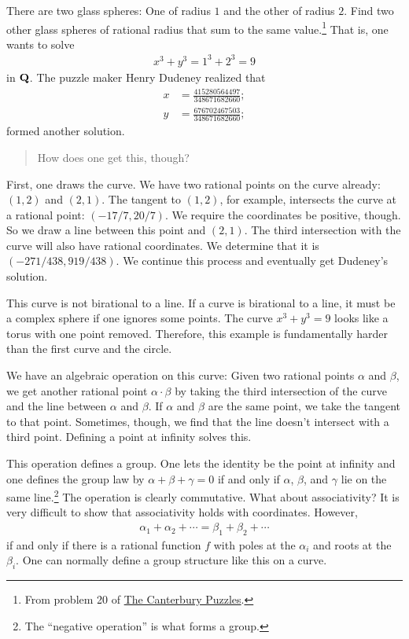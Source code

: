 \documentclass [11 pt, oneside] {article}
\begin{document}
\begin{example}[ ]\label{}\text{}
There are two glass spheres: One of radius $1$ and the other of radius $2$. Find two other glass spheres of rational radius that sum to the same value.\footnote{From problem 20 of \ul{The Canterbury Puzzles}.} That is, one wants to solve
\begin{align*}
	x^3 + y^3 = 1^3 + 2^3 = 9
\end{align*}
in $\mathbf Q$. The puzzle maker Henry Dudeney realized that
\begin{align*}
	x &= \frac{415280564497}{348671682660};\\
	y&= \frac{676702467503}{348671682660};
\end{align*}
formed another solution. 
\begin{quote}
	\small How does one get this, though?
\end{quote}

First, one draws the curve. We have two rational points on the curve already: $(1,2)$ and $(2,1)$. The tangent to $(1,2)$, for example, intersects the curve at a rational point: $(-17/7, 20/7)$. We require the coordinates be positive, though. So we draw a line between this point and $(2,1)$. The third intersection with the curve will also have rational coordinates. We determine that it is $(-271/ 438, 919/438)$. We continue this process and eventually get Dudeney's solution. 
\end{example}

This curve is not birational to a line. If a curve is birational to a line, it must be a complex sphere if one ignores some points. The curve $x^3 + y^3 =9$ looks like a torus with one point removed. Therefore, this example is fundamentally harder than the first curve and the circle.

We have an algebraic operation on this curve: Given two rational points $\alpha$ and $\beta$, we get another rational point $\alpha\cdot \beta$ by taking the third intersection of the curve and the line between $\alpha$ and $\beta$. If $\alpha$ and $\beta$ are the same point, we take the tangent to that point. Sometimes, though, we find that the line doesn't intersect with a third point. Defining a point at infinity solves this.

This operation defines a group. One lets the identity be the point at infinity and one defines the group law by $\alpha+\beta+\gamma = 0$ if and only if $\alpha$, $\beta$, and $\gamma$ lie on the same line.\footnote{The ``negative operation'' is what forms a group.} The operation is clearly commutative. What about associativity? It is very difficult to show that associativity holds with coordinates. However,
\begin{align*}
	\alpha_1+\alpha_2+\cdots = \beta_1+\beta_2+\cdots
\end{align*}
if and only if there is a rational function $f$ with poles at the $\alpha_i$ and roots at the $\beta_i$. One can normally define a group structure like this on a curve.
\end{document}
